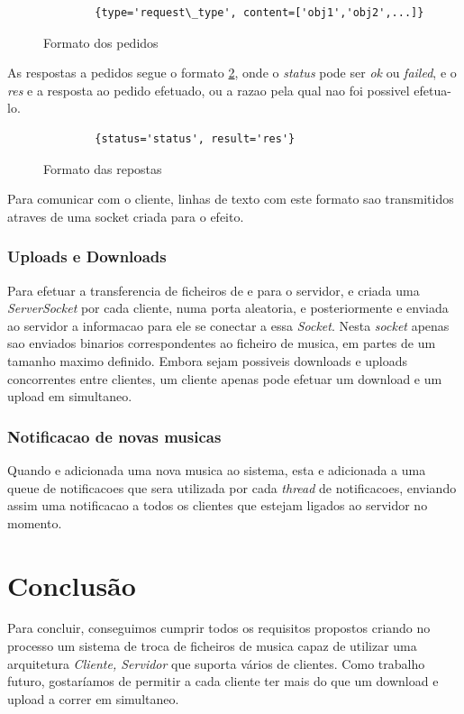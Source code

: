 \documentclass[a4paper]{report}
\begin{document}
\begin{figure}[H]
    \begin{verbatim}
        {type='request\_type', content=['obj1','obj2',...]}
    \end{verbatim}
    \caption{Formato dos pedidos}
    \label{inputformat}
\end{figure}

As respostas a pedidos segue o formato \ref{outputformat}, onde o 
\textit{status} pode ser \textit{ok} ou \textit{failed}, e o \textit{res}
e a resposta ao pedido efetuado, ou a razao pela qual nao foi possivel 
efetua-lo.

\begin{figure}[H]
    \begin{verbatim}
        {status='status', result='res'}
    \end{verbatim}
    \caption{Formato das repostas}
    \label{outputformat}
\end{figure}

Para comunicar com o cliente, linhas de texto com este formato sao transmitidos
atraves de uma socket criada para o efeito.

\subsection{Uploads e Downloads}

Para efetuar a transferencia de ficheiros de e para o servidor, e criada uma
\textit{ServerSocket} por cada cliente, numa porta aleatoria, e posteriormente
e enviada ao servidor a informacao para ele se conectar a essa \textit{Socket}.
Nesta \textit{socket} apenas sao enviados binarios correspondentes ao ficheiro
de musica, em partes de um tamanho maximo definido. Embora sejam possiveis
downloads e uploads concorrentes entre clientes, um cliente apenas pode efetuar
um download e um upload em simultaneo.

\subsection{Notificacao de novas musicas}

Quando e adicionada uma nova musica ao sistema, esta e adicionada a uma queue de
notificacoes que sera utilizada por cada \textit{thread} de notificacoes, 
enviando assim uma notificacao a todos os clientes que estejam ligados ao
servidor no momento.

\chapter{Conclusão}

Para concluir, conseguimos cumprir todos os requisitos propostos criando no processo um
sistema de troca de ficheiros de musica capaz de utilizar uma arquitetura 
\textit{Cliente, Servidor} que suporta vários de clientes.
Como trabalho futuro, gostaríamos de permitir a cada cliente ter mais do que um
download e upload a correr em simultaneo.
\end{document}
